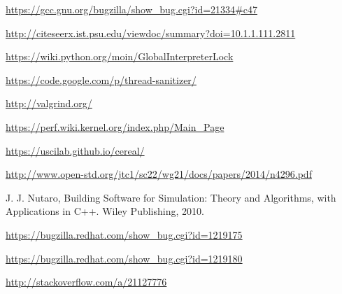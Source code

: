 \documentclass[8pt,a4paper]{report}
\begin{document}
\begin{thebibliography}{1}


   \url{https://gcc.gnu.org/bugzilla/show_bug.cgi?id=21334#c47}

   \url{http://citeseerx.ist.psu.edu/viewdoc/summary?doi=10.1.1.111.2811}
  
   \url{https://wiki.python.org/moin/GlobalInterpreterLock}
  
   \url{https://code.google.com/p/thread-sanitizer/}
  
   \url{http://valgrind.org/}
  
   \url{https://perf.wiki.kernel.org/index.php/Main_Page}
  
   \url{https://uscilab.github.io/cereal/}
  
   \url{http://www.open-std.org/jtc1/sc22/wg21/docs/papers/2014/n4296.pdf}
  
    J. J. Nutaro, Building Software for Simulation: Theory and Algorithms, with
Applications in C++. Wiley Publishing, 2010.

    \url{https://bugzilla.redhat.com/show_bug.cgi?id=1219175}
  
    \url{https://bugzilla.redhat.com/show_bug.cgi?id=1219180}

   \url{http://stackoverflow.com/a/21127776}

  \end{thebibliography}
\end{document}

